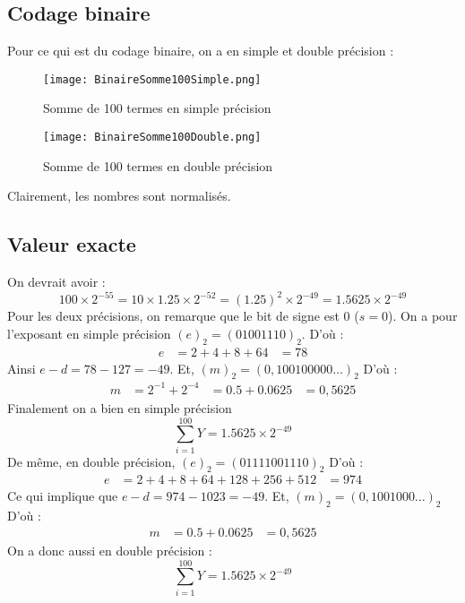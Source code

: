\documentclass[a4paper, titlepage]{livret} %
\begin{document}
			\subsection{Codage binaire}
				Pour ce qui est du codage binaire, on a en simple et double précision :
				\begin{figure}[!h]
					\centering
  						\texttt{[image: BinaireSomme100Simple.png]}
  						\caption{Somme de 100 termes en simple précision}
				\end{figure}
				\begin{figure}[!h]
					\centering
  						\texttt{[image: BinaireSomme100Double.png]}
  						\caption{Somme de 100 termes en double précision}
				\end{figure}

				Clairement, les nombres sont normalisés.

			\subsection{Valeur exacte}
				On devrait avoir :
				\[
					100\times2^{-55} = 10\times1.25\times2^{-52} = (1.25)^2\times2^{-49} = 1.5625\times2^{-49}
				\]
				Pour les deux précisions, on remarque que le bit de signe est $0$ ($s = 0$).
				On a pour l'exposant en simple précision $(e)_{2} = (01001110)_{2}$.
				D'où :
				\[\begin{aligned}
					e & = 2 + 4 + 8 + 64
					  & = 78
				\end{aligned}\]
				Ainsi $e - d = 78 - 127 = -49$.
				Et, $(m)_{2} = (0,100100000…)_{2}$
				D'où :
				\[\begin{aligned}
					m & = 2^{-1} + 2^{-4} 
					  & = 0.5 + 0.0625
					  & = 0,5625
				\end{aligned}\]
				Finalement on a bien en simple précision
				\[
					\sum_{i=1}^{100} Y = 1.5625\times2^{-49}
				\]
				De même, en double précision, $(e)_{2} = (01111001110)_{2}$
				D'où :
				\[\begin{aligned}
					e & = 2 + 4 + 8 + 64 + 128 + 256 + 512
					  & = 974
				\end{aligned}\]
				Ce qui implique que $e - d = 974 - 1023 = -49$.
				Et, $(m)_{2} = (0,1001000…)_{2}$
				D'où :
				\[\begin{aligned}
					m & = 0.5 + 0.0625
					  & = 0,5625
				\end{aligned}\]
				On a donc aussi en double précision :
				\[
					\sum_{i=1}^{100} Y = 1.5625\times2^{-49}
				\]
\end{document}
